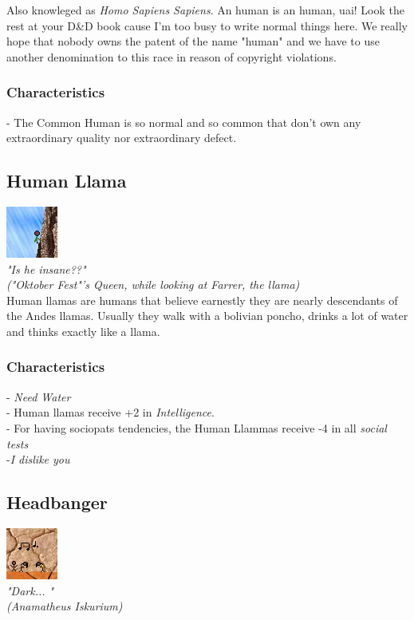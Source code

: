 \documentclass[ letterpaper,12pt]{article}
\begin{document}
Also knowleged as {\it Homo Sapiens Sapiens}. An human is an human, uai! Look
the rest at your D\&D book cause I'm too busy to write normal things here. We
really hope that nobody owns the patent of the name "human" and we have to use
another denomination to this race in reason of copyright violations.

\subsubsection{Characteristics}
- The Common Human is so normal and so common that don't own any extraordinary quality nor extraordinary defect.

\subsection{Human Llama}
\includegraphics{../data/races/Img/llama.png}\\
{\it "Is he insane??"\\
("Oktober Fest"'s Queen, while looking at Farrer, the llama)}\\

Human llamas are humans that believe earnestly they are nearly descendants of
the Andes llamas. Usually they walk with a bolivian poncho, drinks a lot of
water and thinks exactly like a llama.

\subsubsection{Characteristics}
- {\it Need Water}\\
- Human llamas receive +2 in {\it Intelligence}.\\
- For having sociopats tendencies, the Human Llammas receive -4 in all {\it social tests}\\
-{\it I dislike you}\\

\subsection{Headbanger}
\includegraphics{../data/races/Img/metaleiro.png}\\
{\it "Dark... "\\
(Anamatheus Iskurium)\\}
\end{document}
